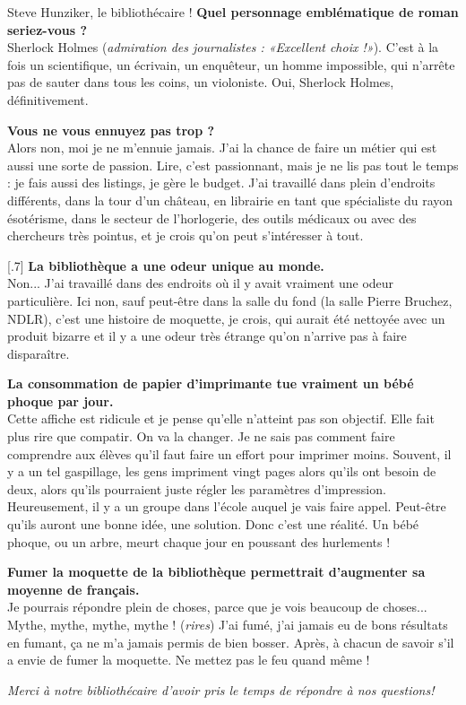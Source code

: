 \begin{article}{Steve Hunziker, le bibliothécaire ! }
\textbf{Quel personnage emblématique de roman seriez-vous ?}\\
Sherlock Holmes (\textit{admiration des journalistes : «Excellent choix !»}). C'est à la fois un scientifique, un écrivain, un enquêteur, un homme impossible, qui n'arrête pas de sauter dans tous les coins, un violoniste. Oui, Sherlock Holmes, définitivement.

\textbf{Vous ne vous ennuyez pas trop ?}\\
Alors non, moi je ne m'ennuie jamais. J'ai la chance de faire un métier qui est aussi une sorte de passion. Lire, c'est passionnant, mais je ne lis pas tout le temps : je fais aussi des listings, je gère le budget. J'ai travaillé dans plein d'endroits différents, dans la tour d'un château, en librairie en tant que spécialiste du rayon ésotérisme, dans le secteur de l'horlogerie, des outils médicaux ou avec des chercheurs très pointus, et je crois qu'on peut s'intéresser à tout.

[.7\baselineskip]
\textbf{La bibliothèque a une odeur unique au monde.}\\
Non... J'ai travaillé dans des endroits où il y avait vraiment une odeur particulière. Ici non, sauf peut-être dans la salle du fond (la salle Pierre Bruchez, NDLR), c'est une histoire de moquette, je crois, qui aurait été nettoyée avec un produit bizarre et il y a une odeur très étrange qu'on n'arrive pas à faire disparaître. 

\textbf{La consommation de papier d'imprimante tue vraiment un bébé phoque par jour.}\\
Cette affiche est ridicule et je pense qu'elle n'atteint pas son objectif. Elle fait plus rire que compatir. On va la changer. Je ne sais pas comment faire comprendre aux élèves qu'il faut faire un effort pour imprimer moins. Souvent, il y a un tel gaspillage, les gens impriment vingt pages alors qu'ils ont besoin de deux, alors qu'ils pourraient juste régler les paramètres d'impression. Heureusement, il y a un groupe dans l'école auquel je vais faire appel. Peut-être qu'ils auront une bonne idée, une solution. Donc c'est une réalité. Un bébé phoque, ou un arbre, meurt chaque jour en poussant des hurlements !

\textbf{Fumer la moquette de la bibliothèque permettrait d'augmenter sa moyenne de français.}\\
Je pourrais répondre plein de choses, parce que je vois beaucoup de choses... Mythe, mythe, mythe, mythe ! (\textit{rires}) J'ai fumé, j'ai jamais eu de bons résultats en fumant, ça ne m'a jamais permis de bien bosser. Après, à chacun de savoir s'il a envie de fumer la moquette. Ne mettez pas le feu quand même !

\textit{Merci à notre bibliothécaire d’avoir pris le temps de répondre à nos questions!}
\end{article}


